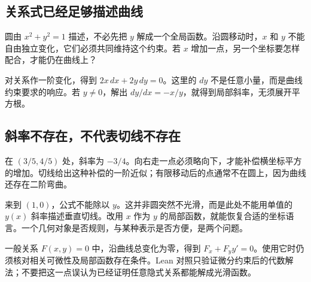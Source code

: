 \subsection*{关系式已经足够描述曲线}
圆由 $x^2+y^2=1$ 描述，不必先把 $y$ 解成一个全局函数。沿圆移动时，$x$ 和 $y$ 不能自由独立变化，它们必须共同维持这个约束。若 $x$ 增加一点，另一个坐标要怎样配合，才能仍在曲线上？

对关系作一阶变化，得到 $2x\,dx+2y\,dy=0$。这里的 $dy$ 不是任意小量，而是曲线约束要求的响应。若 $y\ne0$，解出 $dy/dx=-x/y$，就得到局部斜率，无须展开平方根。

\subsection*{斜率不存在，不代表切线不存在}
在 $(3/5,4/5)$ 处，斜率为 $-3/4$。向右走一点必须略向下，才能补偿横坐标平方的增加。切线给出这种补偿的一阶近似；有限移动后的点通常不在圆上，因为曲线还存在二阶弯曲。

来到 $(1,0)$，公式不能除以 $y$。这并非圆突然不光滑，而是此处不能用单值的 $y(x)$ 斜率描述垂直切线。改用 $x$ 作为 $y$ 的局部函数，就能恢复合适的坐标语言。一个几何对象是否规则，与某种表示是否方便，是两个问题。

一般关系 $F(x,y)=0$ 中，沿曲线总变化为零，得到 $F_x+F_y y'=0$。使用它时仍须核对相关可微性及局部函数存在条件。Lean 对照只验证微分约束后的代数解法；不要把这一点误认为已经证明任意隐式关系都能解成光滑函数。
